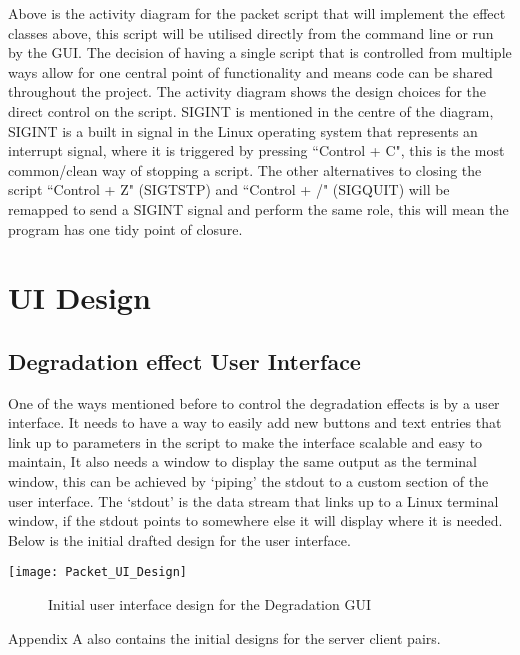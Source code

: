 Above is the activity diagram for the packet script that will implement the effect classes above, this script will be utilised directly from the command line or run by the GUI. The decision of having a single script that is controlled from multiple ways allow for one central point of functionality and means code can be shared throughout the project. The activity diagram shows the design choices for the direct control on the script. SIGINT is mentioned in the centre of the diagram, SIGINT is a built in signal in the Linux operating system that represents an interrupt signal, where it is triggered by pressing ``Control + C", this is the most common/clean way of stopping a script. The other alternatives to closing the script ``Control + Z" (SIGTSTP) and ``Control + /" (SIGQUIT) will be remapped to send a SIGINT signal and perform the same role, this will mean the program has one tidy point of closure.

\section{UI Design}
\subsection{Degradation effect User Interface}
One of the ways mentioned before to control the degradation effects is by a user interface. It needs to have a way to easily add new buttons and text entries that link up to parameters in the script to make the interface scalable and easy to maintain, It also needs a window to display the same output as the terminal window, this can be achieved by `piping' the stdout to a custom section of the user interface. The `stdout' is the data stream that links up to a Linux terminal window, if the stdout points to somewhere else it will display where it is needed. Below is the initial drafted design for the user interface.

\begin{center}
	\texttt{[image: Packet\_UI\_Design]}
	\begin{figure}[h]
		\caption{Initial user interface design for the Degradation GUI}
	\end{figure}
\end{center}

Appendix A also contains the initial designs for the server client pairs.

